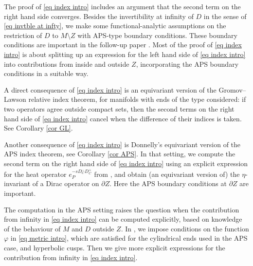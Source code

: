 \documentclass[11pt]{article}
\theoremstyle{plain}
\theoremstyle{definition}
\theoremstyle{remark}
\numberwithin{equation}{section}
\begin{document}
The proof of \eqref{eq index intro} includes an argument that the  second term on the right hand side converges. Besides the invertibility at infinity of $D$ in the sense of \eqref{eq invtble at infty}, we make some functional-analytic assumptions on the restriction of $D$ to  $M \setminus Z$ with APS-type boundary conditions. These boundary conditions are important in the follow-up paper \cite{HW21b}. Most of the proof of \eqref{eq index intro} is about splitting up an expression for the left hand side of \eqref{eq index intro} into contributions from inside and outside $Z$, incorporating the APS boundary conditions in a suitable way.

A direct consequence of \eqref{eq index intro} is an equivariant version of the Gromov--Lawson relative index theorem, for manifolds with ends of the type considered: if two operators agree outside compact sets, then the second terms on the right hand side of \eqref{eq index intro} cancel when the difference of their indices is taken. See Corollary \ref{cor GL}.

Another consequence of \eqref{eq index intro} is Donnelly's equivariant version of the APS index theorem, see Corollary \ref{cor APS}. In that setting, we compute the second term on the right hand side of \eqref{eq index intro} using an explicit expression for the heat operator $e_P^{-s D_C^- D_C^+}$ from \cite{APS1}, and obtain (an equivariant version of) the $\eta$-invariant of a Dirac operator on $\partial Z$. Here the APS boundary conditions at $\partial Z$ are important.

The computation in the APS setting raises the question when  the contribution from infinity in \eqref{eq index intro} can be computed explicitly, based on knowledge of the behaviour of $M$ and $D$ outside $Z$.
In  \cite{HW21b}, we impose conditions on the function $\varphi$ in \eqref{eq metric intro}, which are satisfied for the cylindrical ends used in the APS case, and hyperbolic cusps. Then we give more explicit expressions for the contribution from infinity in \eqref{eq index intro}.

\end{document}
